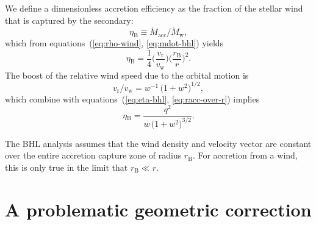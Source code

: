 \documentclass[useAMS, usenatbib, a4paper]{mnras}
\newcommand\wind{\ensuremath{_{\mathrm{w}}}}
\newcommand\mdwind{\ensuremath{\dot M\wind}}
\newcommand\rel{\ensuremath{_{\mathrm{r}}}}
\newcommand\bhl{\ensuremath{_{\mathrm{\scriptscriptstyle B}}}}
\newcommand\acc{\ensuremath{_{\mathrm{acc}}}}
\newcommand\mdacc{\ensuremath{\dot M\acc}}
\begin{document}
We define a dimensionless accretion efficiency as the fraction of the stellar wind that is captured by the secondary:
\begin{equation}
  \label{eq:eta-bhl-def}
  \eta\bhl \equiv \mdacc / \mdwind ,
\end{equation}
which from equations~(\ref{eq:rho-wind}, \ref{eq:mdot-bhl}) yields
\begin{equation}
  \label{eq:eta-bhl}
  \eta\bhl = \frac{1}{4}
  \biggl( \frac{v\rel}{v\wind} \biggr)
  \biggl( \frac{r\bhl}{r}\biggr)^2 . 
\end{equation}
The boost of the relative wind speed due to the orbital motion is
\begin{equation}
  \label{eq:boost-ratio}
  v\rel / v\wind =  w^{-1} \, \bigl(1 + w^2\bigr)^{1/2} ,
\end{equation}
which combine with equations~(\ref{eq:eta-bhl}, \ref{eq:racc-over-r}) implies
\begin{equation}
  \label{eq:eta-bhl-dimensionless}
  \eta\bhl = \frac{q^2}{w \, \bigl(1 + w^2\bigr)^{3/2}} .
\end{equation}

The BHL analysis assumes that the wind density and velocity vector are constant
over the entire accretion capture zone of radius \(r\bhl\).
For accretion from a wind, this is only true in the limit that
\(r\bhl \ll r\). 

\section{A problematic geometric correction}
\label{sec:Tejeda-geometry}
\end{document}
